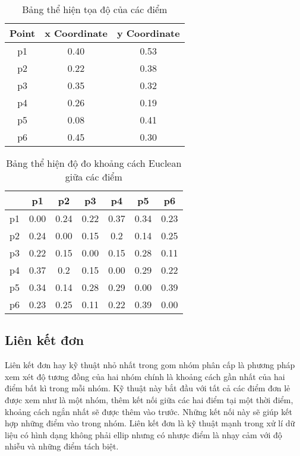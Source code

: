 \begin{table}[h!]
\centering
\caption{Bảng thể hiện tọa độ của các điểm}
\label{tab:2_1}
\begin{tabular}{|c|c|c|}
\hline
Point & x Coordinate & y Coordinate \\ \hline
p1    & 0.40         & 0.53         \\ \hline
p2    & 0.22         & 0.38         \\ \hline
p3    & 0.35         & 0.32         \\ \hline
p4    & 0.26         & 0.19         \\ \hline
p5    & 0.08         & 0.41         \\ \hline
p6    & 0.45         & 0.30         \\ \hline
\end{tabular}
\end{table}

\begin{table}[h!]
\centering
\caption{Bảng thể hiện độ đo khoảng cách Euclean giữa các điểm}
\label{tab:2_2}
\begin{tabular}{|c|c|c|c|c|c|c|}
\hline
   & p1   & p2   & p3   & p4   & p5   & p6   \\ \hline
p1 & 0.00 & 0.24 & 0.22 & 0.37 & 0.34 & 0.23 \\ \hline
p2 & 0.24 & 0.00 & 0.15 & 0.2  & 0.14 & 0.25 \\ \hline
p3 & 0.22 & 0.15 & 0.00 & 0.15 & 0.28 & 0.11 \\ \hline
p4 & 0.37 & 0.2  & 0.15 & 0.00 & 0.29 & 0.22 \\ \hline
p5 & 0.34 & 0.14 & 0.28 & 0.29 & 0.00 & 0.39 \\ \hline
p6 & 0.23 & 0.25 & 0.11 & 0.22 & 0.39 & 0.00 \\ \hline
\end{tabular}%
\end{table}

\subsection{Liên kết đơn}	
\label{sec:lkd}	
Liên kết đơn hay kỹ thuật nhỏ nhất trong gom nhóm phân cấp là phương pháp xem xét độ tương đồng của hai nhóm chính là khoảng cách gần nhất của hai điểm bất kì trong mỗi nhóm. 
Kỹ thuật này bắt đầu với tất cả các điểm đơn lẻ được xem như là một nhóm, thêm kết nối giữa các hai điểm tại một thời điểm, khoảng cách ngắn nhất sẽ được thêm vào trước.
Những kết nối này sẽ giúp kết hợp những điểm vào trong nhóm.
Liên kết đơn là kỹ thuật mạnh trong xử lí dữ liệu có hình dạng không phải ellip nhưng có nhược điểm là nhạy cảm với độ nhiễu và những điểm tách biệt.

